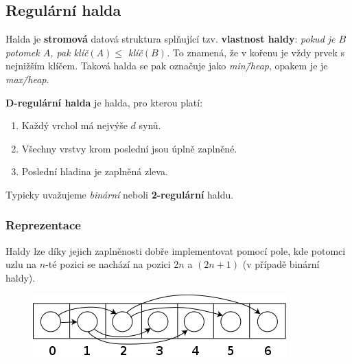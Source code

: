 \documentclass[11pt]{report} %
\numberwithin{equation}{section}
\begin{document}
\subsection{Regulární halda}
Halda je \textbf{stromová} datová struktura splňující tzv. \textbf{vlastnost haldy}: \textit{pokud je $B$ potomek $A$, pak klíč$(A) \leq$ klíč$(B)$.} To znamená, že v kořenu je vždy prvek s nejnižším klíčem. Taková halda se pak označuje jako \textit{min\=/heap}, opakem je je \textit{max\=/heap}. 

\textbf{D-regulární halda} je halda, pro kterou platí:
\begin{enumerate}
  \item Každý vrchol má nejvýše $d$ synů.
  \item Všechny vrstvy krom poslední jsou úplně zaplněné.
  \item Poslední hladina je zaplněná zleva.
\end{enumerate}
Typicky uvažujeme \textit{binární} neboli \textbf{2-regulární} haldu.

\subsubsection{Reprezentace}
Haldy lze díky jejich zaplněnosti dobře implementovat pomocí pole, kde potomci uzlu na $n$-té pozici se nachází na pozici $2n$ a $(2n+1)$ (v případě binární haldy).
\begin{figure}[H]
	\centering
	\includegraphics[scale=0.6]{img/heap.png}
\end{figure}
\end{document}

